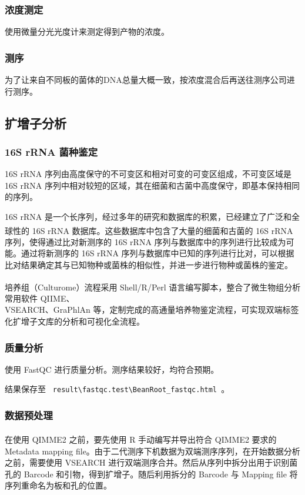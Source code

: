 \documentclass[UTF8]{ctexart}
\begin{document}
    \subsubsection{浓度测定}
    使用微量分光光度计来测定得到产物的浓度。

    \subsubsection{测序}
    为了让来自不同板的菌体的DNA总量大概一致，按浓度混合后再送往测序公司进行测序。


    \subsection{扩增子分析}

    \subsubsection{16S rRNA 菌种鉴定}
    16S rRNA 序列由高度保守的不可变区和相对可变的可变区组成，不可变区域是 16S rRNA 序列中相对较短的区域，其在细菌和古菌中高度保守，即基本保持相同的序列。
    
    16S rRNA 是一个长序列，经过多年的研究和数据库的积累，已经建立了广泛和全球性的 16S rRNA 数据库\textsuperscript{\cite{ref3}}。这些数据库中包含了大量的细菌和古菌的 16S rRNA 序列，使得通过比对新测序的 16S rRNA 序列与数据库中的序列进行比较成为可能。通过将新测序的 16S rRNA 序列与数据库中已知的序列进行比对，可以根据比对结果确定其与已知物种或菌株的相似性，并进一步进行物种或菌株的鉴定。

    培养组（Culturome）流程\textsuperscript{\cite{ref4}}采用 Shell/R/Perl 语言编写脚本，整合了微生物组分析常用软件 QIIME、\\VSEARCH、GraPhlAn 等，定制完成的高通量培养物鉴定流程，可实现双端标签化扩增子文库的分析和可视化全流程。

    \subsubsection{质量分析}
    使用 FastQC 进行质量分析。测序结果较好，均符合预期。

    结果保存至 \verb| result\fastqc.test\BeanRoot_fastqc.html |。

    \subsubsection{数据预处理}
    在使用 QIMME2 之前，要先使用 R 手动编写并导出符合 QIMME2 要求\textsuperscript{\cite{ref5}}的 Metadata mapping file。由于二代测序下机数据为双端测序序列，在开始数据分析之前，需要使用 VSEARCH 进行双端测序合并。然后从序列中拆分出用于识别菌孔的 Barcode 和引物，得到扩增子。随后利用拆分的 Barcode 与 Mapping file 将序列重命名为板和孔的位置。
\end{document}

